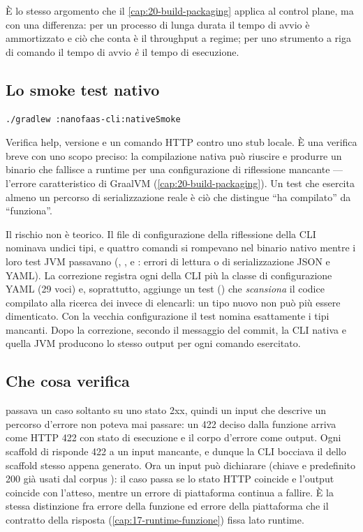 \`E lo stesso argomento che il \cref{cap:20-build-packaging} applica al control
plane, ma con una differenza: per un processo di lunga durata il tempo di avvio
\`e ammortizzato e ci\`o che conta \`e il throughput a regime; per uno strumento a
riga di comando il tempo di avvio \emph{\`e} il tempo di esecuzione.

\subsection{Lo smoke test nativo}

\begin{lstlisting}[language=bash]
./gradlew :nanofaas-cli:nativeSmoke
\end{lstlisting}

Verifica help, versione e un comando HTTP contro uno stub locale. \`E una
verifica breve con uno scopo preciso: la compilazione nativa pu\`o riuscire e
produrre un binario che fallisce a runtime per una configurazione di riflessione
mancante --- l'errore caratteristico di GraalVM
(\cref{cap:20-build-packaging}). Un test che esercita almeno un percorso di
serializzazione reale \`e ci\`o che distingue ``ha compilato'' da ``funziona''.

Il rischio non \`e teorico. Il file di configurazione della riflessione della
CLI nominava undici tipi, e quattro comandi si rompevano nel binario nativo
mentre i loro test JVM passavano (, ,  e : errori di lettura o di
serializzazione JSON e YAML). La correzione registra ogni  della CLI
pi\`u la classe di configurazione YAML (29 voci) e, soprattutto, aggiunge un test
() che \emph{scansiona} il codice
compilato alla ricerca dei  invece di elencarli: un tipo nuovo non
pu\`o pi\`u essere dimenticato. Con la vecchia configurazione il test nomina
esattamente i tipi mancanti. Dopo la correzione, secondo il messaggio del
commit, la CLI nativa e quella JVM producono lo stesso output per ogni comando
esercitato.

\subsection{Che cosa verifica }

 passava un caso soltanto su uno stato 2xx, quindi un input che
descrive un percorso d'errore non poteva mai passare: un 422 deciso dalla
funzione arriva come HTTP 422 con stato di esecuzione  e il corpo
d'errore come output. Ogni scaffold di  risponde 422 a un input
mancante, e dunque la CLI bocciava il  dello scaffold
stesso appena generato. Ora un input pu\`o dichiarare 
(chiave e predefinito 200 gi\`a usati dal corpus ): il caso
passa se lo stato HTTP coincide e l'output coincide con l'atteso, mentre un
errore di piattaforma continua a fallire. \`E la stessa distinzione fra errore
della funzione ed errore della piattaforma che il contratto della risposta
(\cref{cap:17-runtime-funzione}) fissa lato runtime.

